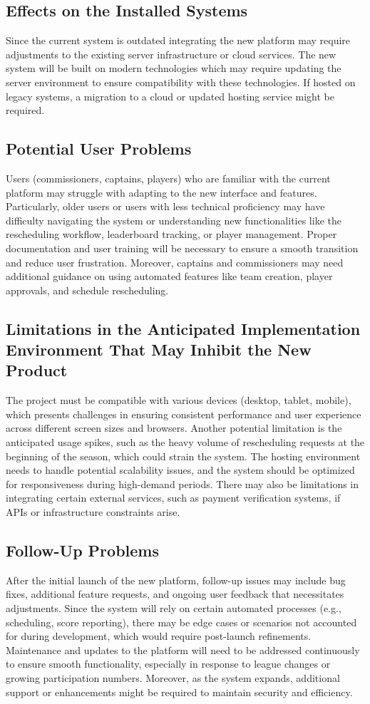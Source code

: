\documentclass[12pt]{article}
\begin{document}
\subsection{Effects on the Installed Systems}
Since the current system is outdated integrating the new platform may require adjustments to the existing server infrastructure or cloud services. The new system will be built on modern technologies which may require updating the server environment to ensure compatibility with these technologies. If hosted on legacy systems, a migration to a cloud or updated hosting service might be required.
\subsection{Potential User Problems}
Users (commissioners, captains, players) who are familiar with the current platform may struggle with adapting to the new interface and features. Particularly, older users or users with less technical proficiency may have difficulty navigating the system or understanding new functionalities like the rescheduling workflow, leaderboard tracking, or player management. Proper documentation and user training will be necessary to ensure a smooth transition and reduce user frustration. Moreover, captains and commissioners may need additional guidance on using automated features like team creation, player approvals, and schedule rescheduling.
\subsection{Limitations in the Anticipated Implementation Environment That May
Inhibit the New Product}
The project must be compatible with various devices (desktop, tablet, mobile), which presents challenges in ensuring consistent performance and user experience across different screen sizes and browsers. Another potential limitation is the anticipated usage spikes, such as the heavy volume of rescheduling requests at the beginning of the season, which could strain the system. The hosting environment needs to handle potential scalability issues, and the system should be optimized for responsiveness during high-demand periods. There may also be limitations in integrating certain external services, such as payment verification systems, if APIs or infrastructure constraints arise.
\subsection{Follow-Up Problems}
After the initial launch of the new platform, follow-up issues may include bug fixes, additional feature requests, and ongoing user feedback that necessitates adjustments. Since the system will rely on certain automated processes (e.g., scheduling, score reporting), there may be edge cases or scenarios not accounted for during development, which would require post-launch refinements. Maintenance and updates to the platform will need to be addressed continuously to ensure smooth functionality, especially in response to league changes or growing participation numbers. Moreover, as the system expands, additional support or enhancements might be required to maintain security and efficiency.
\end{document}
